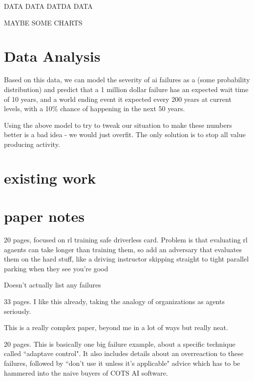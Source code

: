 \documentclass[11pt]{article}
\begin{document}
DATA DATA DATDA DATA

MAYBE SOME CHARTS

\section{Data Analysis}


Based on this data, we can model the severity of ai failures as a (some probability distribution)
and predict that a 1 million dollar failure has an expected wait time of 10 years, and a world
ending event it expected every 200 years at current levels, with a 10\% chance of happening in the
next 50 years.

Using the above model to try to tweak our situation to make these numbers better is a bad idea - we
would just overfit. The only solution is to stop all value producing activity.






\section{existing work}

\section{paper notes}

\cite{uesato2018adversarial}

20 pages, focused on rl training safe driverless card. Problem is that evaluating rl agaents
can take longer than training them, so add an adversary that evaluates them on the hard stuff,
like a driving instructor skipping straight to tight parallel parking when they see you're good

Doesn't actually list any failures

\cite{wallace2018landscapes}

33 pages. I like this already, taking the analogy of organizations as agents seriously.

This is a really complex paper, beyond me in a lot of ways but really neat.

\cite{anderson2005control}

20 pages. This is basically one big failure example, about a specific technique called ``adaptave
control". It also includes details about an overreaction to these failures, followed by ``don't use
it unless it's applicable" advice which has to be hammered into the naive buyers of COTS AI
software.
\end{document}
